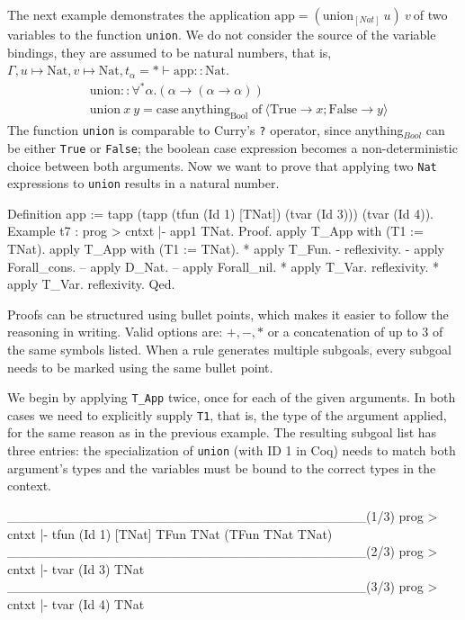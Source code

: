 \documentclass[paper = a4, fleqn, abstract=on, twoside]{scrreprt}
\newcommand{\coqinline}[1]{\texttt{#1}}
\begin{document}
\par \noindent
The next example demonstrates the application $\text{app} = (\text{union}_{[Nat]} \: u) \: v \:$of two variables to the function \texttt{union}. We do not consider the source of the variable bindings, they are assumed to be natural numbers, that is, $\Gamma, u \mapsto \text{Nat}, v \mapsto \text{Nat}, t_{\alpha} = * \vdash \text{app} :: \text{Nat}$.
\begin{align*}
&\text{union}::\forall^{*}\alpha.(\alpha \rightarrow (\alpha \rightarrow \alpha))\\
&\text{union}\: x \: y = \text{case}\: \text{anything}_{\text{Bool}} \; \text{of}\: \langle \text{True} \rightarrow x; \text{False} \rightarrow y\rangle
\end{align*}
The function \texttt{union} is comparable to Curry's \texttt{?} operator, since anything$_{Bool}$ can be either \texttt{True} or \texttt{False}; the boolean case expression becomes a non-deterministic choice between both arguments. Now we want to prove that applying two \texttt{Nat} expressions to \texttt{union} results in a natural number.
\begin{coqcode}
Definition app := tapp (tapp (tfun (Id 1) [TNat])
                             (tvar (Id 3)))
                       (tvar (Id 4)).    
Example t7 : prog > cntxt |- app1 \in TNat.              
Proof.
 apply T_App with (T1 := TNat). apply T_App with (T1 := TNat).
   * apply T_Fun.
     - reflexivity.
     - apply Forall_cons.
       -- apply D_Nat.
       -- apply Forall_nil.
   * apply T_Var. reflexivity.
   * apply T_Var. reflexivity.
Qed.
\end{coqcode}
Proofs can be structured using bullet points, which makes it easier to follow the reasoning in writing. Valid options are: $+, -, *$ or a concatenation of up to 3 of the same symbols listed. When a rule generates multiple subgoals, every subgoal needs to be marked using the same bullet point.
\par
We begin by applying \coqinline{T_App} twice, once for each of the given arguments. In both cases we need to explicitly supply \coqinline{T1}, that is, the type of the argument applied, for the same reason as in the previous example. The resulting subgoal list has three entries: the specialization of \texttt{union} (with ID 1 in Coq) needs to match both argument's types and the variables must be bound to the correct types in the context. 
\begin{coqcode}
______________________________________(1/3)
prog > cntxt |- tfun (Id 1) [TNat] \in TFun TNat (TFun TNat TNat)
______________________________________(2/3)
prog > cntxt |- tvar (Id 3) \in TNat
______________________________________(3/3)
prog > cntxt |- tvar (Id 4) \in TNat
\end{coqcode}
\end{document}
